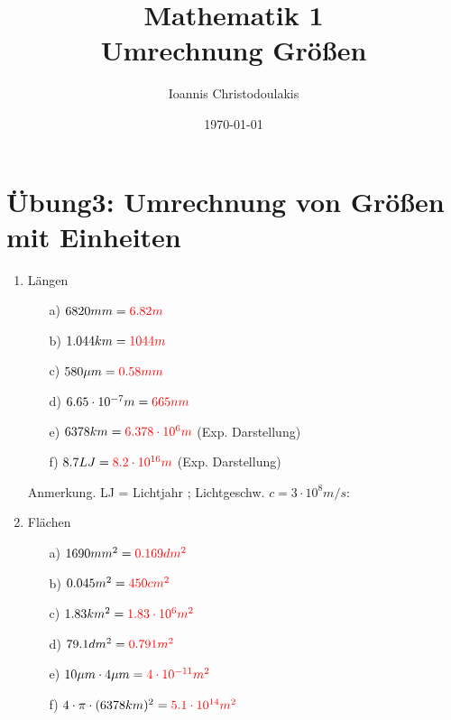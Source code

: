 \documentclass[11pt, a4paper, twoside, fleqn]{article}
\title{\Huge Mathematik 1\\
\large Umrechnung Größen}
\author{Ioannis Christodoulakis}
\date{\today}
\begin{document}
\maketitle
\newpage
\tableofcontents
\newpage
\section{Übung3: Umrechnung von Größen mit Einheiten}
\begin{enumerate}[itemsep=1ex, leftmargin=*]
\item Längen
    \begin{enumerate}[itemsep=2mm]
        \item[a)] $ 6820 mm = \textcolor{red}{6.82 m} $
        \item[b)] $ 1.044 km = \textcolor{red}{1044 m} $
        \item[c)] $ 580 \mu m = \textcolor{red}{0.58 mm} $
        \item[d)] $ 6.65 \cdot 10^{-7} m = \textcolor{red}{665 nm} $
        \item[e)] $ 6378 km = \textcolor{red}{6.378 \cdot 10^{6} m } $ (Exp. Darstellung)
        \item[f)] $ 8.7 LJ = \textcolor{red}{8.2 \cdot 10^{16} m} $ (Exp. Darstellung)
    \end{enumerate}
    Anmerkung. LJ = Lichtjahr ; Lichtgeschw. $ c = 3\cdot 10^{8} m/s : $
\item Flächen
    \begin{enumerate}[itemsep=2mm]
        \item[a)] $ 1690 mm^{2} = \textcolor{red}{0.169 dm^{2}} $
        \item[b)] $ 0.045 m^{2} = \textcolor{red}{450 cm^{2}} $
        \item[c)] $ 1.83 km^{2} = \textcolor{red}{1.83 \cdot 10^{6} m^{2}} $
        \item[d)] $ 79.1 dm^{2} = \textcolor{red}{0.791 m^{2}} $
        \item[e)] $ 10 \mu m \cdot 4 \mu m = \textcolor{red}{4 \cdot 10^{-11} m^{2}} $ 
        \item[f)] $ 4 \cdot \pi \cdot (6378 km)^{2} = \textcolor{red}{5.1 \cdot 10^{14} m^{2}} $
    \end{enumerate}

\end{enumerate}
\end{document}
